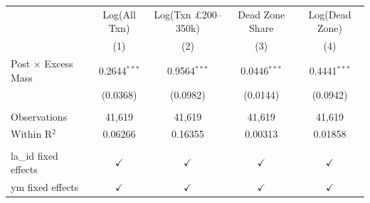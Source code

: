 \begingroup
\centering
\begin{tabular}{lcccc}
   \toprule
                              & Log(All Txn)   & Log(Txn \pounds200--350k)  & Dead Zone Share & Log(Dead Zone)\\  
                              & (1)            & (2)                        & (3)             & (4)\\  
   \midrule 
   Post $\times$ Excess Mass  & 0.2644$^{***}$ & 0.9564$^{***}$             & 0.0446$^{***}$  & 0.4441$^{***}$\\   
                              & (0.0368)       & (0.0982)                   & (0.0144)        & (0.0942)\\   
    \\
   Observations               & 41,619         & 41,619                     & 41,619          & 41,619\\  
   Within R$^2$               & 0.06266        & 0.16355                    & 0.00313         & 0.01858\\  
    \\
   la\_id fixed effects       & $\checkmark$   & $\checkmark$               & $\checkmark$    & $\checkmark$\\   
   ym fixed effects           & $\checkmark$   & $\checkmark$               & $\checkmark$    & $\checkmark$\\   
   \bottomrule
\end{tabular}
\par\endgroup
